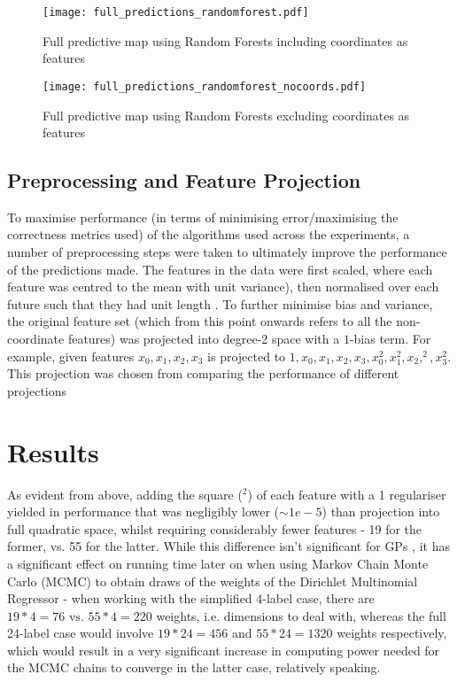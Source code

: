 \begin{figure}[H]
    \begin{minipage}{.49\linewidth}
        \texttt{[image: full\_predictions\_randomforest.pdf]}
        \caption{Full predictive map using Random Forests including coordinates as features}
        \label{fig:rf_w_coords_preds}
    \end{minipage}
    \hfill
    \begin{minipage}{.49\linewidth}
        \texttt{[image: full\_predictions\_randomforest\_nocoords.pdf]}
        \caption{Full predictive map using Random Forests excluding coordinates as features}
        \label{fig:rf_wo_coords_preds}
    \end{minipage}
\end{figure}

\subsection{Preprocessing and Feature Projection}
To maximise performance (in terms of minimising error/maximising the correctness metrics used) of the algorithms used across the experiments, a number of preprocessing steps were taken to ultimately improve the performance of the predictions made. The features in the data were first scaled, where each feature was centred to the mean with unit variance), then normalised over each future such that they had unit length . To further minimise bias and variance, the original feature set (which from this point onwards refers to all the non-coordinate features) was projected into degree-2 space with a $1$-bias term. For example, given features $x_0, x_1, x_2, x_3$ is projected to $1, x_0, x_1, x_2, x_3, x_0^2, x_1^2, x_2,^2, x_3^2$. This projection was chosen from comparing the performance of different projections



\section{Results}
As evident from above, adding the square ($^2$) of each feature with a 1 regulariser  yielded in performance that was negligibly lower ($\sim 1e-5$) than projection into full quadratic space, whilst requiring considerably fewer features - 19 for the former, vs. 55 for the latter. While this difference isn't significant for GPs , it has a significant effect on running time later on when using Markov Chain Monte Carlo (MCMC) to obtain draws of the weights of the Dirichlet Multinomial Regressor - when working with the simplified 4-label case, there are $19*4 =76 \text{ vs. } 55*4=220$ weights, i.e. dimensions to deal with, whereas the full 24-label case would involve $19*24=456$ and $55*24=1320$ weights respectively, which would result in a very significant increase in computing power needed for the MCMC chains to converge in the latter case, relatively speaking.

